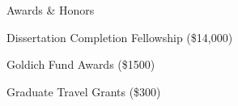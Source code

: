 \begin{cvlist}{Awards \& Honors}
    \item Dissertation Completion Fellowship (\$14,000)
    \item Goldich Fund Awards (\$1500)
    \item Graduate Travel Grants (\$300)
\end{cvlist}
